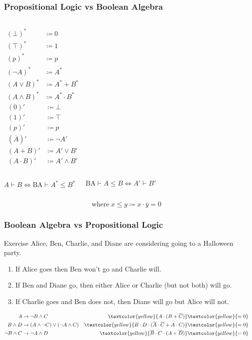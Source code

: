 \documentclass[UTF8,aspectratio=43,11pt,colorlinks,compress,openany]{beamer}%
\begin{document}
\begin{frame}\frametitle{Propositional Logic vs Boolean Algebra}
\setlength\abovedisplayskip{0pt}
\setlength\abovedisplayskip{0pt}
	\begin{columns}
			\begin{align*}
			(\bot)^*&\coloneqq 0\\
			(\top)^*&\coloneqq 1\\
			(p)^*&\coloneqq p\\
			(\neg A)^*&\coloneqq \overline{A^*}\\
			(A\vee B)^*&\coloneqq A^*+B^*\\
			(A\wedge B)^*&\coloneqq A^*\cdot B^*
			\end{align*}
			\begin{align*}
			(0)'&\coloneqq \bot\\
			(1)'&\coloneqq \top\\
			(p)'&\coloneqq p\\
			\left(\overline{A}\right)'&\coloneqq \neg A'\\
			(A+B)'&\coloneqq A'\vee B'\\
			(A\cdot B)'&\coloneqq A'\wedge B'
			\end{align*}
	\end{columns}
\begin{columns}
\begin{block}{}
	\[A\vdash B\iff\mathrm{BA}\vdash A^*\leq B^*\]
\end{block}
\begin{block}{}
	\[\mathrm{BA}\vdash A\leq B\iff A'\vdash B'\]
\end{block}
\end{columns}
	\[\text{where}\; x\leq y\coloneqq x\cdot\overline{y}=0\]
\end{frame}

\begin{frame}\frametitle{Boolean Algebra vs Propositional Logic}
	\begin{block}{Exercise}
		Alice, Ben, Charlie, and Diane are considering going to a
		Halloween party.
		\begin{enumerate}
			\item If Alice goes then Ben won't go and Charlie will.
			\item If Ben and Diane go, then either Alice or Charlie (but not both) will go.
			\item If Charlie goes and Ben does not, then Diane will go but Alice will not.
		\end{enumerate}
	\end{block}
	\begin{align*}
	A&\to\neg B\wedge C &\textcolor{yellow}{A\cdot(B+\overline{C})}&\textcolor{yellow}{=0}\\
	B\wedge D&\to(A\wedge\neg C)\vee(\neg A\wedge C) &\textcolor{yellow}{B\cdot D\cdot(\overline{A}\cdot\overline{C}+A\cdot C)}&\textcolor{yellow}{=0}\\
	\neg B\wedge C&\to\neg A\wedge D &\textcolor{yellow}{\overline{B}\cdot C\cdot(A+\overline{D})}&\textcolor{yellow}{=0}
	\end{align*}
\end{frame}
\end{document}
